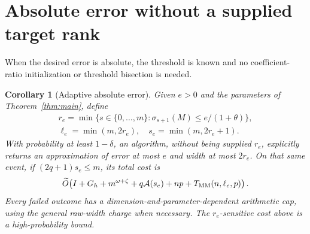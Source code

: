 \documentclass[11pt]{article}
\newtheorem{corollary}[theorem]{Corollary}
\newcommand{\tO}{\widetilde O}
\newcommand{\MM}{T_{\rm MM}}
\newcommand{\Ac}{\mathcal A}
\begin{document}
\section{Absolute error without a supplied target rank}
When the desired error is absolute, the threshold is known and no
coefficient-ratio initialization or threshold bisection is needed.

\begin{corollary}[Adaptive absolute error]\label{cor:absolute}
Given \(e>0\) and the parameters of Theorem~\ref{thm:main}, define
\begin{gather*}
 r_e=\min\{s\in\{0,\ldots,m\}:\sigma_{s+1}(M)\leq e/(1+\theta)\},\\
 \ell_e=\min(m,2r_e),\quad s_e=\min(m,2r_e+1).
\end{gather*}
With probability at least \(1-\delta\), an algorithm, without being
supplied \(r_e\), explicitly returns an approximation of error at most
\(e\) and width at most \(2r_e\). On that same event, if
\((2q+1)s_e\leq m\), its total cost is
\begin{equation}\label{eq:absolute}
 \tO\!\left(I+G_h+m^{\omega+\zeta}+q\Ac(s_e)
                  +np+\MM(n,\ell_e,p)\right).
\end{equation}
Every failed outcome has a dimension-and-parameter-dependent arithmetic
cap, using the general raw-width charge when necessary. The
\(r_e\)-sensitive cost above is a high-probability bound.
\end{corollary}
\end{document}
